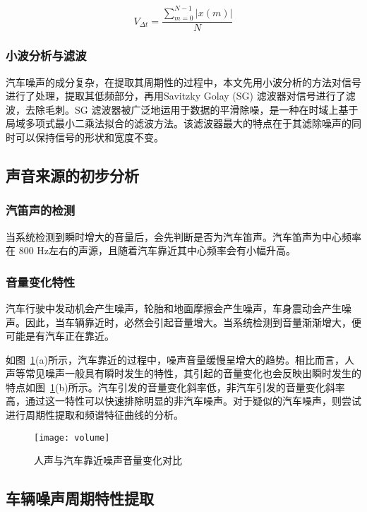 \begin{equation}
\label{equ:chap3:volume}
V_{\Delta t}= \frac{\sum_{m=0}^{N-1}\left | x\left ( m \right ) \right |}{N}
\end{equation}

\subsubsection{小波分析与滤波}

汽车噪声的成分复杂，在提取其周期性的过程中，本文先用小波分析的方法对信号进行了处理，提取其低频部分，再用Savitzky Golay (SG) 滤波器对信号进行了滤波，去除毛刺。SG 滤波器被广泛地运用于数据的平滑除噪，是一种在时域上基于局域多项式最小二乘法拟合的滤波方法。该滤波器最大的特点在于其滤除噪声的同时可以保持信号的形状和宽度不变。

\subsection{声音来源的初步分析}
\subsubsection{汽笛声的检测}

当系统检测到瞬时增大的音量后，会先判断是否为汽车笛声。汽车笛声为中心频率在 800 Hz左右的声源，且随着汽车靠近其中心频率会有小幅升高。

\subsubsection{音量变化特性}

汽车行驶中发动机会产生噪声，轮胎和地面摩擦会产生噪声，车身震动会产生噪声。因此，当车辆靠近时，必然会引起音量增大。当系统检测到音量渐渐增大，便可能是有汽车正在靠近。

如图~\ref{fig:volume}(a)所示，汽车靠近的过程中，噪声音量缓慢呈增大的趋势。相比而言，人声等常见噪声一般具有瞬时发生的特性，其引起的音量变化也会反映出瞬时发生的特点如图~\ref{fig:volume}(b)所示。汽车引发的音量变化斜率低，非汽车引发的音量变化斜率高，通过这一特性可以快速排除明显的非汽车噪声。对于疑似的汽车噪声，则尝试进行周期性提取和频谱特征曲线的分析。

\begin{figure}[htbp] %
  \centering
  \texttt{[image: volume]}
  \caption[音量变化特性对比]{人声与汽车靠近噪声音量变化对比}
  \label{fig:volume}
\end{figure}

\subsection{车辆噪声周期特性提取}

